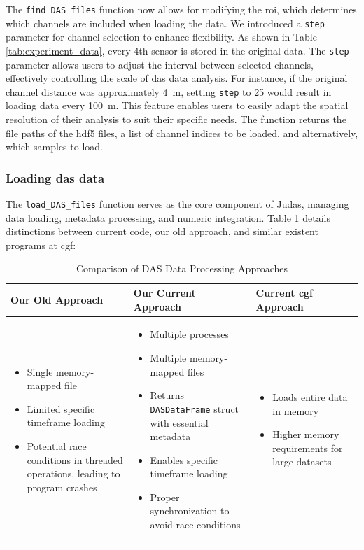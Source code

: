 The \texttt{find\_DAS\_files} function now allows for modifying the \acrfull{roi}, which determines which channels are included when loading the data. We introduced a \texttt{step} parameter for channel selection to enhance flexibility. As shown in Table \ref{tab:experiment_data}, every 4th sensor is stored in the original data. The \texttt{step} parameter allows users to adjust the interval between selected channels, effectively controlling the scale of \acrshort{das} data analysis. For instance, if the original channel distance was approximately \qty{4}{\meter}, setting \texttt{step} to 25 would result in loading data every \qty{100}{\meter}. This feature enables users to easily adapt the spatial resolution of their analysis to suit their specific needs.
The function returns the file paths of the \acrshort{hdf5} files, a list of channel indices to be loaded, and alternatively, which samples to load.
%
\subsubsection{Loading \acrshort{das} data}
The \texttt{load\_DAS\_files} function serves as the core component of Judas, managing data loading, metadata processing, and numeric integration. Table \ref{tab:das-comparison} details distinctions between current code, our old approach, and similar existent programs at \acrshort{cgf}:
%
\begin{table}[htbp]
\centering
\begin{tabular}{p{}|p{}|p{}}
\hline
\textbf{Our Old Approach} & \textbf{Our Current Approach} & \textbf{Current \acrshort{cgf} Approach} \\
\hline
\begin{itemize}[leftmargin=*]
    \item Single memory-mapped file
    \item Limited specific timeframe loading
    \item Potential race conditions in threaded operations, leading to program crashes
\end{itemize}
&
\begin{itemize}[leftmargin=*]
    \item Multiple processes
    \item Multiple memory-mapped files
    \item Returns \texttt{DASDataFrame} struct with essential metadata
    \item Enables specific timeframe loading
    \item Proper synchronization to avoid race conditions
\end{itemize}
&
\begin{itemize}[leftmargin=*]
    \item Loads entire data in memory
    \item Higher memory requirements for large datasets
\end{itemize} \\
\hline
\end{tabular}
\caption{Comparison of DAS Data Processing Approaches}
\label{tab:das-comparison}
\end{table}


